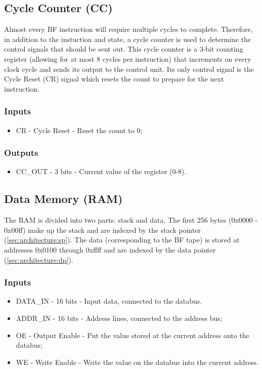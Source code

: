 \subsection{Cycle Counter (CC)} \label{sec:architecture:cc}
Almost every BF instruction will require multiple cycles to complete. Therefore, in addition to the instuction and state, a cycle counter is used to determine the control signals that should be sent out.  This cycle counter is a 3-bit counting register (allowing for at most 8 cycles per instruction) that increments on every clock cycle and sends its output to the control unit. Its only control signal is the Cycle Reset (CR) signal which resets the count to prepare for the next instruction.

\subsubsection*{Inputs}
\begin{itemize}
\itemsep0em
\item CR - Cycle Reset - Reset the count to 0;
\end{itemize}

\subsubsection*{Outputs}
\begin{itemize}
\itemsep0em
\item CC\_OUT - 3 bits - Current value of the register (0-8).
\end{itemize}

\subsection{Data Memory (RAM)}  \label{sec:architecture:ram}
The RAM is divided into two parts: stack and data. The first 256 bytes (0x0000 - 0x00ff) make up the stack and are indexed by the stack pointer (\ref{sec:architecture:sp}). The data (corresponding to the BF tape) is stored at addresses 0x0100 through 0xffff and are indexed by the data pointer (\ref{sec:architecture:dp}). 

\subsubsection*{Inputs}
\begin{itemize}
\itemsep0em 
\item DATA\_IN - 16 bits - Input data, connected to the databus.
\item ADDR\_IN - 16 bits - Address lines, connected to the address bus;
\item OE - Output Enable - Put the value stored at the current address onto the databus;
\item WE - Write Enable - Write the value on the databus into the current address.
\end{itemize}


